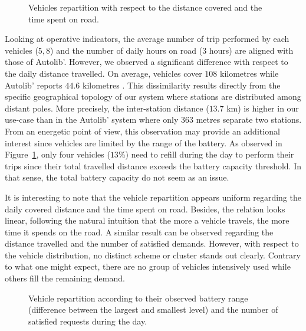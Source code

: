 \begin{bibunit}[ieeetr]
\begin{figure}[t]
\centering

\caption{Vehicles repartition with respect to the distance covered and the time spent on road.}
\label{fig:VehicleDistVsNbTSTraveling}
\end{figure}
\medskip
Looking at operative indicators, the average number of trip performed by each vehicles ($5,8$) and the number of daily hours on road ($3$ hours) are aligned with those of Autolib'.
However, we observed a significant difference with respect to the daily distance travelled.
On average, vehicles cover $108$ kilometres while Autolib' reports $44.6$ kilometres \cite{autolib_rapport_2014}.
This dissimilarity results directly from the specific geographical topology of our system where stations are distributed among distant poles.
More precisely, the inter-station distance ($13.7$ km) is higher in our use-case than in the Autolib' system where only $363$ metres separate two stations.
From an energetic point of view, this observation may provide an additional interest since vehicles are limited by the range of the battery.
As observed in Figure~\ref{fig:VehicleDistVsNbTSTraveling}, only four vehicles ($13$\%) need to refill during the day to perform their trips since their total travelled distance exceeds the battery capacity threshold.
In that sense, the total battery capacity do not seem as an issue.

It is interesting to note that the vehicle repartition appears uniform regarding the daily covered distance and the time spent on road.
Besides, the relation looks linear, following the natural intuition that the more a vehicle travels, the more time it spends on the road.
A similar result can be observed regarding the distance travelled and the number of satisfied demands.
However, with respect to the vehicle distribution, no distinct scheme or cluster stands out clearly.
Contrary to what one might expect, there are no group of vehicles intensively used while others fill the remaining demand.


\begin{figure}[t]
\centering

\caption{Vehicle repartition according to their observed battery range (difference between the largest and smallest level) and the number of satisfied requests during the day.}
\label{fig:MaxEnergyUsedVsNbTSTraveling}
\end{figure}


\end{bibunit}
